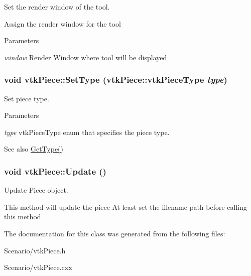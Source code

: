 Set the render window of the tool. 

Assign the render window for the tool 
\begin{DoxyParams}{Parameters}
\item[{\em window}]Render Window where tool will be displayed \end{DoxyParams}
\hypertarget{classvtkPiece_a19bed21306aacd30f7890ff6d364d025}{
\subsubsection[{SetType}]{\setlength{\rightskip}{0pt plus 5cm}void vtkPiece::SetType ({\bf vtkPiece::vtkPieceType} {\em type})}}
\label{classvtkPiece_a19bed21306aacd30f7890ff6d364d025}


Set piece type. 


\begin{DoxyParams}{Parameters}
\item[{\em type}]vtkPieceType enum that specifies the piece type. \end{DoxyParams}
\begin{DoxySeeAlso}{See also}
\hyperlink{classvtkPiece_a337c7aa8f4c6a65cee2f436eedc29038}{GetType()} 
\end{DoxySeeAlso}
\hypertarget{classvtkPiece_ac27cfcc5591305b572274c7f1d422fe8}{
\subsubsection[{Update}]{\setlength{\rightskip}{0pt plus 5cm}void vtkPiece::Update ()}}
\label{classvtkPiece_ac27cfcc5591305b572274c7f1d422fe8}


Update Piece object. 

This method will update the piece At least set the filename path before calling this method 

The documentation for this class was generated from the following files:\begin{DoxyCompactItemize}
\item 
Scenario/vtkPiece.h\item 
Scenario/vtkPiece.cxx\end{DoxyCompactItemize}
